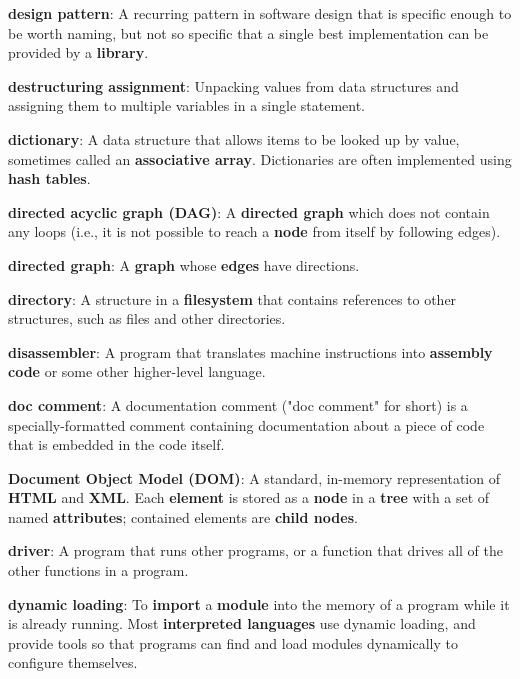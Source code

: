 \documentclass[krantzl]{krantz}
\newcommand{\glosskey}[1]{\textbf{#1}}
\begin{document}
\noindent \textbf{\glosskey{design pattern}}: 
A recurring pattern in software design that is specific enough to be worth naming, but not so specific that a single best implementation can be provided by a \glosskey{library}.


\noindent \textbf{\glosskey{destructuring assignment}}: 
Unpacking values from data structures and assigning them to multiple variables in a single statement.


\noindent \textbf{\glosskey{dictionary}}: 
A data structure that allows items to be looked up by value, sometimes called an \glosskey{associative array}. Dictionaries are often implemented using \glosskey{hash tables}.


\noindent \textbf{\glosskey{directed acyclic graph} (DAG)}: 
A \glosskey{directed graph} which does not contain any loops (i.e., it is not possible to reach a \glosskey{node} from itself by following edges).


\noindent \textbf{\glosskey{directed graph}}: 
A \glosskey{graph} whose \glosskey{edges} have directions.


\noindent \textbf{\glosskey{directory}}: 
A structure in a \glosskey{filesystem} that contains references to other structures, such as files and other directories.


\noindent \textbf{\glosskey{disassembler}}: 
A program that translates machine instructions into \glosskey{assembly code} or some other higher-level language.


\noindent \textbf{\glosskey{doc comment}}: 
A documentation comment ("doc comment" for short) is a specially-formatted comment containing documentation about a piece of code that is embedded in the code itself.


\noindent \textbf{\glosskey{Document Object Model} (DOM)}: 
A standard, in-memory representation of \glosskey{HTML} and \glosskey{XML}. Each \glosskey{element} is stored as a \glosskey{node} in a \glosskey{tree} with a set of named \glosskey{attributes}; contained elements are \glosskey{child nodes}.


\noindent \textbf{\glosskey{driver}}: 
A program that runs other programs, or a function that drives all of the other functions in a program.


\noindent \textbf{\glosskey{dynamic loading}}: 
To \glosskey{import} a \glosskey{module} into the memory of a program while it is already running. Most \glosskey{interpreted languages} use dynamic loading, and provide tools so that programs can find and load modules dynamically to configure themselves.
\end{document}
